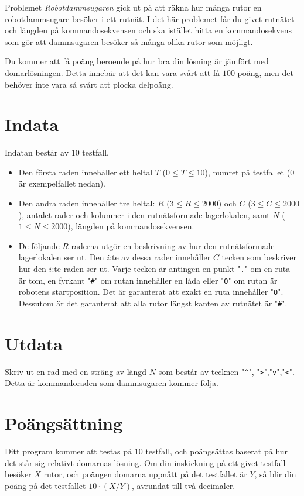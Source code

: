 
Problemet \textit{Robotdammsugaren} gick ut på att räkna hur många rutor en robotdammsugare
besöker i ett rutnät. I det här problemet får du givet rutnätet och längden på kommandosekvensen
och ska istället hitta en kommandosekvens som gör att dammsugaren besöker så många olika rutor som möjligt.

Du kommer att få poäng beroende på hur bra din lösning är jämfört med domarlösningen. Detta innebär att det kan vara
svårt att få $100$ poäng, men det behöver inte vara så svårt att plocka delpoäng.

\section*{Indata}
Indatan består av $10$ testfall.

\begin{itemize}
  \item 
    Den första raden innehåller ett heltal $T$ ($0 \leq T \leq 10$), numret på testfallet ($0$ är exempelfallet nedan).
  \item
    Den andra raden innehåller tre heltal: $R$ ($3 \le R \le 2000$) och $C$ ($3 \le C \le 2000$),
    antalet rader och kolumner i den rutnätsformade lagerlokalen, samt $N$ ($1 \le N \le 2000$), längden på kommandosekvensen.
  \item
    De följande $R$ raderna utgör en beskrivning av hur den rutnätsformade lagerlokalen ser ut.
    Den $i$:te av dessa rader innehåller $C$ tecken som beskriver hur den $i$:te raden ser ut.
    Varje tecken är antingen en punkt "\verb|.|" om en ruta är tom, en fyrkant "\verb|#|" om rutan innehåller en låda eller "\verb|O|" om rutan är robotens startposition. Det är garanterat att exakt en ruta innehåller "\verb|O|". Dessutom är det garanterat att alla rutor längst kanten av rutnätet är "\verb|#|".
\end{itemize}

\section*{Utdata}
Skriv ut en rad med en sträng av längd $N$ som består av tecknen "\verb|^|", "\verb|>|","\verb|v|","\verb|<|".
Detta är kommandoraden som dammsugaren kommer följa.


\section*{Poängsättning}
Ditt program kommer att testas på $10$ testfall, och poängsättas baserat på hur det står sig relativt domarnas lösning.
Om din inskickning på ett givet testfall besöker $X$ rutor, och poängen domarna uppnått på det testfallet är $Y$,
så blir din poäng på det testfallet $10 \cdot (X / Y)$, avrundat till två decimaler.

